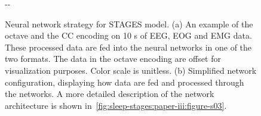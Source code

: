 \begin{figure}
\begin{adjustwidth*}{}{-\marginparwidth-\marginparsep}
    \myfloatalign   
      \\
    \caption[Neural network strategy for \acs{STAGES} model]{Neural network strategy for \ac{STAGES} model. (a) An example of the octave and the \ac{CC} encoding on 10 s of \ac{EEG}, \ac{EOG} and \ac{EMG} data. These processed data are fed into the neural networks in one of the two formats. The data in the octave encoding are offset for visualization purposes. Color scale is unitless. (b) Simplified network configuration, displaying how data are fed and processed through the networks. A more detailed description of the network architecture is shown in~\cref{fig:sleep-stages:paper-iii:figure-s03}.}
    \label{fig:sleep-stages:paper-iii:figure-06}
\end{adjustwidth*}
\end{figure}


